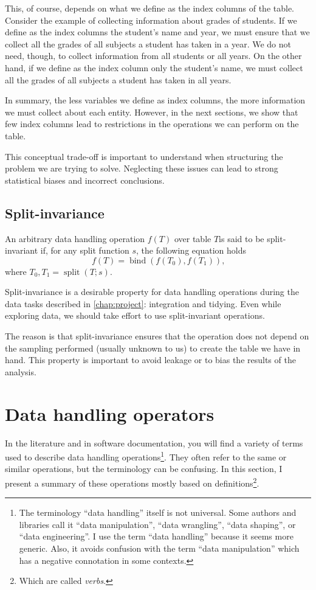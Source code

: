 This, of course, depends on what we define as the index columns of the table.  Consider
the example of collecting information about grades of students.  If we define as the index
columns the student's name and year, we must ensure that we collect all the grades of all
subjects a student has taken in a year.  We do not need, though, to collect information
from all students or all years.  On the other hand, if we define as the index column only
the student's name, we must collect all the grades of all subjects a student has taken in
all years.

In summary, the less variables we define as index columns, the more information we must
collect about each entity.  However, in the next sections, we show that few index columns
lead to restrictions in the operations we can perform on the table.

This conceptual trade-off is important to understand when structuring the problem we are
trying to solve.  Neglecting these issues can lead to strong statistical biases and
incorrect conclusions.

\subsection{Split-invariance}

An arbitrary data handling operation $f(T)$ over table $T$is said to be split-invariant
if, for any split function $s$, the following equation holds \[
  f\!\left(T\right) =
    \operatorname{bind}\!\left(f\!\left(T_0\right), f\!\left(T_1\right)\right)\text{,}
\] where $T_0, T_1 = \operatorname{split}\!\left(T; s\right)$.

Split-invariance is a desirable property for data handling operations during the data
tasks described in \cref{chap:project}: integration and tidying.  Even while exploring
data, we should take effort to use split-invariant operations.

The reason is that split-invariance ensures that the operation does not depend on the
sampling performed (usually unknown to us) to create the table we have in hand.  This
property is important to avoid \gls{leakage} or to bias the results of the analysis.

\section{Data handling operators}

In the literature and in software documentation, you will find a variety of terms used to
describe data handling operations\footnote{%
  The terminology ``data handling'' itself is not universal.  Some authors and libraries
  call it ``data manipulation'', ``data wrangling'', ``data shaping'', or ``data
  engineering''.  I use the term ``data handling'' because it seems more generic.
  Also, it avoids confusion with the term ``data
  manipulation'' which has a negative connotation in some contexts.}. %
They often refer to the same or similar operations, but the terminology can be confusing.
In this section, I present a summary of these operations mostly based on
\textcite{Wickham2023} definitions\footnote{Which are called \emph{verbs}.}.

